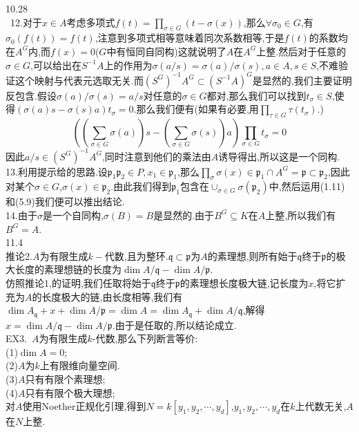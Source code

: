 \documentclass[b5paper]{ctexart}
\begin{document}
\pagestyle{plain}
\noindent
{}
10.28\\
~12.对于$x\in A$考虑多项式$f(t)=\prod_{\sigma\in G}(t-\sigma(x))$,那么$\forall \sigma_0\in G$,有$\sigma_0(f(t))=f(t)$,注意到多项式相等意味着同次系数相等,于是$f(t)$的系数均在$A^G$内,而$f(x)=0$($G$中有恒同自同构)这就说明了$A$在$A^G$上整.然后对于任意的$\sigma\in G$,可以给出在$S^{-1}A$上的作用为$\sigma(a/s)=\sigma(a)/\sigma(s),a\in A,s\in S$,不难验证这个映射与代表元选取无关.而$(S^{G})^{-1}A^{G}\subset (S^{-1}A)^G$是显然的,我们主要证明反包含.假设$\sigma(a)/\sigma(s)=a/s$对任意的$\sigma\in G$都对,那么我们可以找到$t_\sigma\in S$,使得$(\sigma(a)s-\sigma(s)a)t_\sigma=0$.那么我们便有(如果有必要,用$\prod_{\tau\in G}\tau(t_\sigma)$.)
\[\left( \left( \sum_{\sigma\in G}\sigma(a)\right)s-\left( \sum_{\sigma\in G}\sigma(s)\right)a\right)\prod_{\sigma\in G}t_\sigma=0  \]
因此$a/s\in (S^G)^{-1}A^G$,同时注意到他们的乘法由$A$诱导得出,所以这是一个同构.\\
13.利用提示给的思路.设$\mathfrak{p}_1\mathfrak{p}_2\in P,x_1\in\mathfrak{p}_1$,那么$\prod\limits_{\sigma}\sigma(x)\in \mathfrak{p}_1\cap A^G=\mathfrak{p}\subset \mathfrak{p}_2$,因此对某个$\sigma\in G$,$\sigma(x)\in\mathfrak{p}_2$.由此我们得到$\mathfrak{p}_1$包含在$\cup_{\sigma\in G}\sigma(\mathfrak{p}_2)$中,然后运用(1.11)和(5.9)我们便可以推出结论.\\
14.由于$\sigma$是一个自同构,$\sigma(B)=B$是显然的.由于$B^G\subseteq K$在$A$上整,所以我们有$B^G=A$.\\
11.4\\
推论2.$A$为有限生成$k-$代数,且为整环.$\mathfrak{q}\subset\mathfrak{p}$为$A$的素理想,则所有始于$\mathfrak{q}$终于$\mathfrak{p}$的极大长度的素理想链的长度为$\dim A/\mathfrak{q}-\dim A/\mathfrak{p}$.\\
仿照推论1,的证明,我们任取将始于$\mathfrak{q}$终于$\mathfrak{p}$的素理想长度极大链,记长度为$x$,将它扩充为$A$的长度极大的链,由长度相等,我们有$\dim A_{\mathfrak{q}}+x+\dim A/\mathfrak{p}=\dim A=\dim A_{\mathfrak{q}}+\dim A/\mathfrak{q}$,解得$x=\dim A/\mathfrak{q}-\dim A/\mathfrak{p}$.由于是任取的,所以结论成立.\\
EX3.~$A$为有限生成$k$-代数,那么下列断言等价:\\
(1)$\dim A=0$;\\
(2)$A$为$k$上有限维向量空间.\\
(3)$A$只有有限个素理想;\\
(4)$A$只有有限个极大理想;\\
对$A$使用Noether正规化引理,得到$N=k[y_1,y_2,\cdots,y_d]$,$y_1,y_2,\cdots,y_d$在$k$上代数无关,$A$在$N$上整.\\
\end{document}
